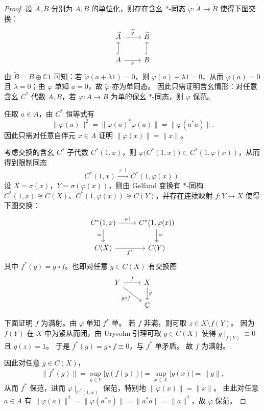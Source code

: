 \documentclass[lang=cn,a4paper,newtx,section]{elegantbook}
\begin{document}
\begin{proof}
  设 $\widetilde{A},\widetilde{B}$ 分别为 $A,B$ 的单位化，则存在含幺 $*$-同态 $\widetilde{\varphi}:\widetilde{A}\to\widetilde{B}$ 使得下图交换：
  \[
    \begin{tikzcd}
      \widetilde{A} \arrow[r, "\widetilde{\varphi}"] & \widetilde{B} \\
      A \arrow[u, hook] \arrow[r, "\varphi"'] & B \arrow[u, hook]
    \end{tikzcd}
  \]
  由 $\widetilde{B}=B\oplus\mathbb{C}1$ 可知：若 $\widetilde{\varphi}(a+\lambda 1)=0$，则 $\varphi(a)+\lambda 1=0$，从而 $\varphi(a)=0$ 且 $\lambda=0$；由 $\varphi$ 单知 $a=0$，故 $\widetilde{\varphi}$ 亦为单同态。
  因此只需证明含幺情形：对任意含幺 $C^{*}$ 代数 $A,B$，若 $\varphi:A\to B$ 为单的保幺 $*$-同态，则 $\varphi$ 保范。

  任取 $a\in A$，由 $C^{*}$ 恒等式有
  \[
    \|\varphi(a)\|^{2}=\|\varphi(a)^{*}\varphi(a)\|=\|\varphi(a^{*}a)\|.
  \]
  因此只需对任意自伴元 $x\in A$ 证明 $\|\varphi(x)\|=\|x\|$。

  考虑交换的含幺 $C^{*}$ 子代数 $C^{*}(1,x)$，则 $\varphi\bigl(C^{*}(1,x)\bigr)\subset C^{*}(1,\varphi(x))$，从而得到限制同态
  \[
    C^{*}(1,x)\xrightarrow{\ \varphi\ \mid\ } C^{*}(1,\varphi(x)).
  \]
  设 $X=\sigma(x)$，$Y=\sigma(\varphi(x))$，则由 Gelfand 变换有 $*$-同构 $C^{*}(1,x)\cong C(X)$、$C^{*}(1,\varphi(x))\cong C(Y)$，并存在连续映射 $f:Y\to X$ 使得下图交换：
  \[
    \begin{tikzcd}
      C^{*}(1,x) \arrow[r, "\varphi\mid"] \arrow[d, "\cong"'] & C^{*}(1,\varphi(x)) \arrow[d, "\cong"] \\
      C(X) \arrow[r, "f^{*}"'] & C(Y)
    \end{tikzcd}
  \]
  其中 $f^{*}(g)=g\circ f$。也即对任意 $g\in C(X)$ 有交换图
  \[
    \begin{tikzcd}
      Y \arrow[r, "f"] \arrow[dr, "g\circ f"'] & X \arrow[d, "g"] \\
      & \mathbb{C}
    \end{tikzcd}
  \]

  下面证明 $f$ 为满射。由 $\varphi$ 单知 $f^{*}$ 单。
  若 $f$ 非满，则可取 $z\in X\setminus f(Y)$。
  因为 $f(Y)$ 在 $X$ 中为紧从而闭，由 Urysohn 引理可取 $g\in C(X)$ 使得 $g\mid_{f(Y)}\equiv 0$ 且 $g(z)=1$。
  于是 $f^{*}(g)=g\circ f\equiv 0$，与 $f^{*}$ 单矛盾。
  故 $f$ 为满射。

  因此对任意 $g\in C(X)$，
  \[
    \|f^{*}(g)\|=\sup_{y\in Y}|g(f(y))|=\sup_{x\in X}|g(x)|=\|g\|,
  \]
  从而 $f^{*}$ 保范，进而 $\varphi\mid_{C^{*}(1,x)}$ 保范，特别地 $\|\varphi(x)\|=\|x\|$。
  由此对任意 $a\in A$ 有 $\|\varphi(a)\|^{2}=\|\varphi(a^{*}a)\|=\|a^{*}a\|=\|a\|^{2}$，故 $\varphi$ 保范。
\end{proof}
\end{document}
